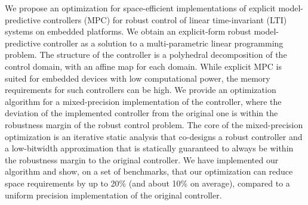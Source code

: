 We propose an optimization for space-efficient implementations of explicit model-predictive controllers (MPC)
for robust control of linear time-invariant (LTI) systems on embedded platforms. 
We obtain an explicit-form robust model-predictive controller as a solution to a multi-parametric 
linear programming problem.
The structure of the controller is a polyhedral decomposition of the control domain,
with an affine map for each domain.
While explicit MPC is suited for embedded devices with low computational power, the memory requirements
for such controllers can be high.
We provide an optimization algorithm for a mixed-precision implementation of the controller,
where the deviation of the implemented controller from the original one is within the robustness
margin of the robust control problem.
The core of the mixed-precision optimization is an iterative static analysis that co-designs
a robust controller and a low-bitwidth approximation 
that is statically guaranteed to always be within the robustness margin to the original controller.
We have implemented our algorithm and show, on a set of benchmarks, that our optimization
can reduce space requirements by up to 20\% (and about 10\% on average), compared to a uniform precision
implementation of the original controller.

